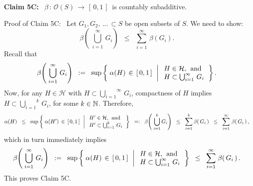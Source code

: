 \vskip 0.2cm
\begin{center}
\begin{minipage}{6.5in}
\textbf{Claim 5C:} \,
$\beta \,:\, \mathcal{O}(S) \,\longrightarrow\, [\,0,1\,]$\, is countably subadditive.
\end{minipage}
\end{center}
Proof of Claim 5C: \,
Let $G_{1}, G_{2}, \,\ldots\, \subset S$ be open subsets of $S$.
We need to show:
\begin{equation*}
\beta\!\left(\;\bigcup_{i=1}^{\infty}\,G_{i}\right)
\;\; \leq \;\; \sum_{i=1}^{\infty}\,\beta\!\left(G_{i}\right).
\end{equation*}
Recall that
\begin{equation*}
\beta\!\left(\;\bigcup_{i=1}^{\infty}\,G_{i}\right)
\;\; := \;\;
\sup\left\{\;
	\alpha(H) \,\in\, [\,0,1\,]
	\,\;\left\vert\;
		\begin{array}{l} H \in \mathcal{H}, \;\,\textnormal{and} \\ H \subset \bigcup_{i=1}^{\infty}\,G_{i} \end{array}
	\right.
\right\}.
\end{equation*}
Now, for any $H \in \mathcal{H}$ with $H \subset \overset{\infty}{\underset{i=1}{\bigcup}}\,G_{i}$,
compactness of $H$ implies $H \subset \overset{k}{\underset{i=1}{\bigcup}}\,G_{i}$, for some $k \in \mathbb{N}$.
Therefore,
\begin{equation*}
\alpha(H)
\;\; \leq \;\;
\sup\left\{\;
	\alpha(H^{\prime}) \,\in\, [\,0,1\,]
	\,\;\left\vert\;
		\begin{array}{l} H^{\prime} \in \mathcal{H}, \;\,\textnormal{and} \\ H^{\prime} \subset \bigcup_{i=1}^{k}\,G_{i} \end{array}
	\right.
\right\}
\;\; =: \;\; \beta\!\left(\;\overset{k}{\underset{i=1}{\bigcup}}\,G_{i}\right)
\;\;\leq\;\; \overset{k}{\underset{i=1}{\sum}}\,\beta\!\left(\,G_{i}\,\right)
\;\;\leq\;\; \overset{\infty}{\underset{i=1}{\sum}}\;\beta\!\left(\,G_{i}\,\right),
\end{equation*}
which in turn immediately implies
\begin{equation*}
\beta\!\left(\;\bigcup_{i=1}^{\infty}\,G_{i}\right)
\;\; := \;\;
\sup\left\{\;
	\alpha(H) \,\in\, [\,0,1\,]
	\,\;\left\vert\;
		\begin{array}{l} H \in \mathcal{H}, \;\,\textnormal{and} \\ H \subset \bigcup_{i=1}^{\infty}\,G_{i} \end{array}
	\right.
\right\}
\;\;\leq\;\; \overset{\infty}{\underset{i=1}{\sum}}\;\beta\!\left(\,G_{i}\,\right).
\end{equation*}
This proves Claim 5C.

